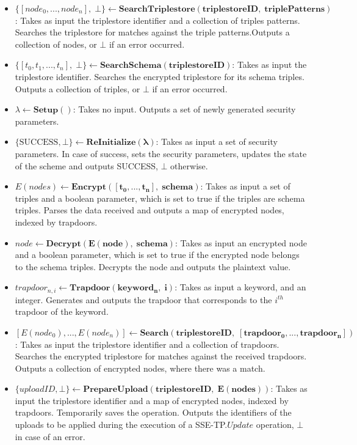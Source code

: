 \begin{definition}
\begin{itemize}
        \item $\{[node_0, ..., node_n], \; \bot\} \leftarrow \mathbf{SearchTriplestore(triplestoreID, \; triplePatterns)}$: Takes as input the triplestore identifier and a collection of triples patterns. Searches the triplestore for matches against the triple patterns.Outputs a collection of nodes, or $\bot$ if an error occurred.
        \item $\{[t_0, t_1, ..., t_n], \; \bot\} \leftarrow \mathbf{SearchSchema(triplestoreID)}$: Takes as input the triplestore identifier. Searches the encrypted triplestore for its schema triples. Outputs a collection of triples, or $\bot$ if an error occurred.
        \item $\lambda \leftarrow \mathbf{Setup()}$: Takes no input. Outputs a set of newly generated security parameters.
        \item $\{\textrm{SUCCESS}, \bot\} \leftarrow \mathbf{ReInitialize(\lambda)}$: Takes as input a set of security parameters. In case of success, sets the security parameters, updates the state of the scheme and outputs SUCCESS, $\bot$ otherwise.
        \item $E(nodes) \leftarrow \mathbf{Encrypt([t_0,..., t_n], \; schema)}$: Takes as input a set of triples and a boolean parameter, which is set to true if the triples are schema triples. Parses the data received and outputs a map of encrypted nodes, indexed by trapdoors.
        \item $node \leftarrow \mathbf{Decrypt(E(node), \; schema)}$: Takes as input an encrypted node and a boolean parameter, which is set to true if the encrypted node belongs to the schema triples. Decrypts the node and outputs the plaintext value.
        \item $trapdoor_{n,i} \leftarrow \mathbf{Trapdoor(keyword_n, \; i)}$: Takes as input a keyword, and an integer. Generates and outputs the trapdoor that corresponds to the $i^{th}$ trapdoor of the keyword.
        \item $[E(node_0), ..., E(node_n)] \leftarrow \mathbf{Search(triplestoreID, \; [trapdoor_0, ..., trapdoor_n])}$: Takes as input the triplestore identifier and a collection of trapdoors. Searches the encrypted triplestore for matches against the received trapdoors. Outputs a collection of encrypted nodes, where there was a match.
        \item $\{uploadID, \bot\} \leftarrow \mathbf{PrepareUpload(triplestoreID, \; E(nodes))}$: Takes as input the triplestore identifier and a map of encrypted nodes, indexed by trapdoors. Temporarily saves the operation. Outputs the identifiers of the uploads to be applied during the execution of a SSE-TP.$Update$ operation, $\bot$ in case of an error.

\end{itemize}
\end{definition}
